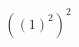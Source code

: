 \documentclass[preview]{standalone}
\begin{document}
\begin{align*}
{ \left({ \left(1\right) }^{2}\right) }^{2}
\end{align*}
\end{document}
